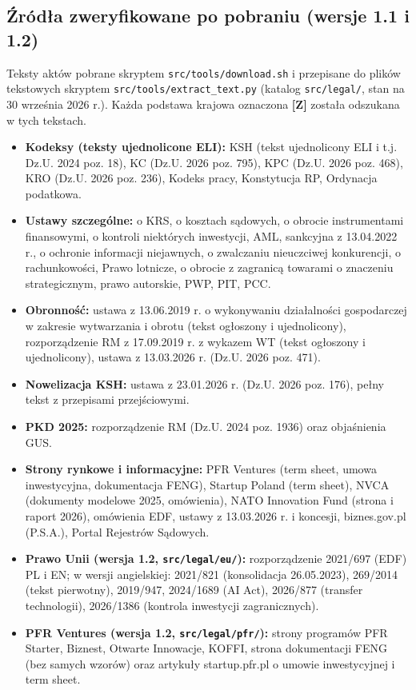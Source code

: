 \documentclass[12pt,a4paper]{report}
\newcommand{\Wiar}[1]{\textbf{[#1]}}
\begin{document}
\subsection*{Źródła zweryfikowane po pobraniu (wersje 1.1 i 1.2)}
Teksty aktów pobrane skryptem \texttt{src/tools/download.sh} i przepisane do plików tekstowych skryptem \texttt{src/tools/extract\_text.py} (katalog \texttt{src/legal/}, stan na 30 września 2026 r.). Każda podstawa krajowa oznaczona \Wiar{Z} została odszukana w tych tekstach.
\begin{itemize}
  \item \textbf{Kodeksy (teksty ujednolicone ELI):} KSH (tekst ujednolicony ELI i t.j. Dz.U. 2024 poz. 18), KC (Dz.U. 2026 poz. 795), KPC (Dz.U. 2026 poz. 468), KRO (Dz.U. 2026 poz. 236), Kodeks pracy, Konstytucja RP, Ordynacja podatkowa.
  \item \textbf{Ustawy szczególne:} o KRS, o kosztach sądowych, o obrocie instrumentami finansowymi, o kontroli niektórych inwestycji, AML, sankcyjna z 13.04.2022 r., o ochronie informacji niejawnych, o zwalczaniu nieuczciwej konkurencji, o rachunkowości, Prawo lotnicze, o obrocie z zagranicą towarami o znaczeniu strategicznym, prawo autorskie, PWP, PIT, PCC.
  \item \textbf{Obronność:} ustawa z 13.06.2019 r. o wykonywaniu działalności gospodarczej w zakresie wytwarzania i obrotu (tekst ogłoszony i ujednolicony), rozporządzenie RM z 17.09.2019 r. z wykazem WT (tekst ogłoszony i ujednolicony), ustawa z 13.03.2026 r. (Dz.U. 2026 poz. 471).
  \item \textbf{Nowelizacja KSH:} ustawa z 23.01.2026 r. (Dz.U. 2026 poz. 176), pełny tekst z przepisami przejściowymi.
  \item \textbf{PKD 2025:} rozporządzenie RM (Dz.U. 2024 poz. 1936) oraz objaśnienia GUS.
  \item \textbf{Strony rynkowe i informacyjne:} PFR Ventures (term sheet, umowa inwestycyjna, dokumentacja FENG), Startup Poland (term sheet), NVCA (dokumenty modelowe 2025, omówienia), NATO Innovation Fund (strona i raport 2026), omówienia EDF, ustawy z 13.03.2026 r. i koncesji, biznes.gov.pl (P.S.A.), Portal Rejestrów Sądowych.
  \item \textbf{Prawo Unii (wersja 1.2, \texttt{src/legal/eu/}):} rozporządzenie 2021/697 (EDF) PL i EN; w wersji angielskiej: 2021/821 (konsolidacja 26.05.2023), 269/2014 (tekst pierwotny), 2019/947, 2024/1689 (AI Act), 2026/877 (transfer technologii), 2026/1386 (kontrola inwestycji zagranicznych).
  \item \textbf{PFR Ventures (wersja 1.2, \texttt{src/legal/pfr/}):} strony programów PFR Starter, Biznest, Otwarte Innowacje, KOFFI, strona dokumentacji FENG (bez samych wzorów) oraz artykuły startup.pfr.pl o umowie inwestycyjnej i term sheet.

\end{itemize}
\end{document}

